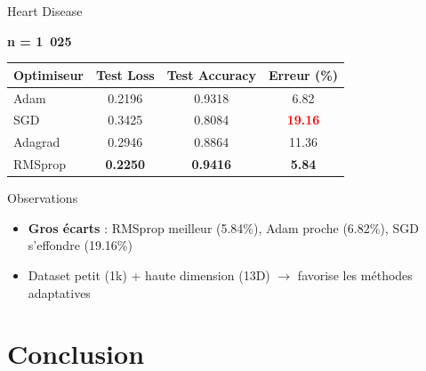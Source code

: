 \documentclass{beamer}
\begin{document}
\begin{frame}{Heart Disease}

\begin{center}
\textbf{n = 1~025}
\end{center}

\vspace{-0.1cm}

\begin{center}
\begin{tabular}{|l|c|c|c|}
\hline
\textbf{Optimiseur} & \textbf{Test Loss} & \textbf{Test Accuracy} & \textbf{Erreur (\%)} \\
\hline
Adam & 0.2196 & 0.9318 & 6.82 \\
SGD & 0.3425 & 0.8084 & \textcolor{red}{\textbf{19.16}} \\
Adagrad & 0.2946 & 0.8864 & 11.36 \\
RMSprop & \textbf{0.2250} & \textbf{0.9416} & \textcolor{mygreen}{\textbf{5.84}} \\
\hline
\end{tabular}
\end{center}

\vspace{0.2cm}

\begin{block}{Observations}
\begin{itemize}
  \item \textbf{Gros écarts} : RMSprop meilleur (5.84\%), Adam proche (6.82\%), SGD s'effondre (19.16\%)
  \item Dataset petit (1k) + haute dimension (13D) $\rightarrow$ favorise les méthodes adaptatives
\end{itemize}
\end{block}

\end{frame}

\section{Conclusion}
\end{document}
